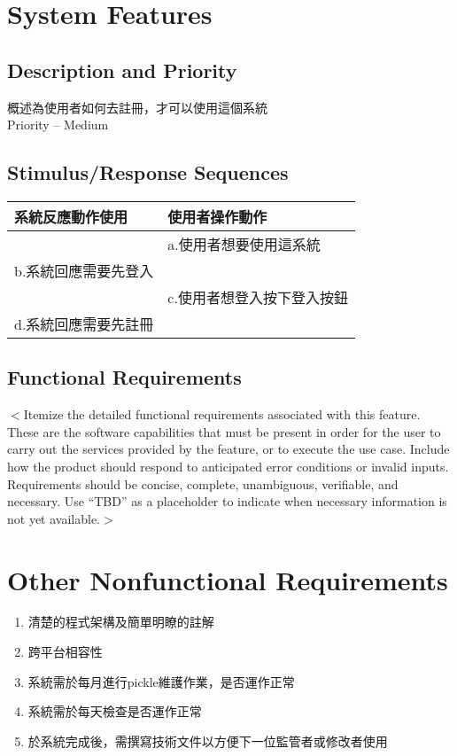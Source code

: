 \documentclass{scrreprt}
\begin{document}
\begin{CJK*}{UTF8}{bsmi}
\chapter{System Features}

\section{Description and Priority}
概述為使用者如何去註冊，才可以使用這個系統\\
Priority – Medium

\section{Stimulus/Response Sequences}
\begin{center}
\begin{tabular}{|l|l|}\hline
系統反應動作使用 & 使用者操作動作  \\ \hline
 & a.使用者想要使用這系統  \\ \hline
b.系統回應需要先登入 &   \\\hline
 & c.使用者想登入按下登入按鈕  \\\hline
d.系統回應需要先註冊&   \\\hline
\end{tabular}
\end{center}

\section{Functional Requirements}
$<$Itemize the detailed functional requirements associated with this feature.  
These are the software capabilities that must be present in order for the user 
to carry out the services provided by the feature, or to execute the use case.  
Include how the product should respond to anticipated error conditions or 
invalid inputs. Requirements should be concise, complete, unambiguous, 
verifiable, and necessary. Use “TBD” as a placeholder to indicate when necessary 
information is not yet available.$>$

\chapter{Other Nonfunctional Requirements}
\begin{enumerate}
\item 清楚的程式架構及簡單明瞭的註解
\item 跨平台相容性
\item 系統需於每月進行pickle維護作業，是否運作正常
\item 系統需於每天檢查是否運作正常
\item 於系統完成後，需撰寫技術文件以方便下一位監管者或修改者使用
\end{enumerate}

\end{CJK*}
\end{document}
